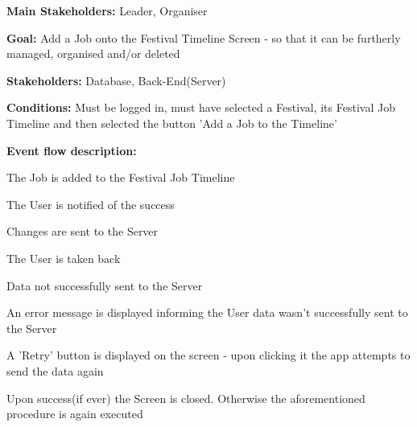 			\noindent {}
			\begin{packed_item}
				\item \textbf{Main Stakeholders:} Leader, Organiser
				\item \textbf{Goal:} Add a Job onto the Festival Timeline Screen - so that it can be furtherly managed, organised and/or deleted
				\item \textbf{Stakeholders: } Database, Back-End(Server)
				\item \textbf{Conditions: } Must be logged in, must have selected a Festival, its Festival Job Timeline and then selected the button 'Add a Job to the Timeline'
				\item \textbf{Event flow description: }
				\begin{packed_enum}
					\item The Job is added to the Festival Job Timeline
					\item The User is notified of the success
					\item Changes are sent to the Server
					\item The User is taken back
				\end{packed_enum}
				
				\begin{packed_item}
					\item[3.a] Data not successfully sent to the Server
					\item[] \begin{packed_enum}
						\item An error message is displayed informing the User data wasn't successfully sent to the Server
						\item A 'Retry' button is displayed on the screen - upon clicking it the app attempts to send the data again
						\item Upon success(if ever) the Screen is closed. Otherwise the aforementioned procedure is again executed
					\end{packed_enum}
				\end{packed_item}
			\end{packed_item}
			
